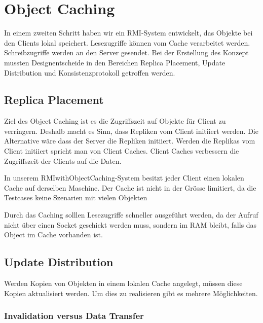 \chapter{Object Caching}

\label{sec:object-caching}

In einem zweiten Schritt haben wir ein RMI-System entwickelt, das Objekte bei den Clients lokal speichert. Lesezugriffe können vom Cache verarbeitet werden. Schreibzugriffe werden an den Server gesendet. Bei der Erstellung des Konzept mussten Designentscheide in den Bereichen Replica Placement, Update Distribution und Konsistenzprotokoll getroffen werden.

\section{Replica Placement}
\label{sec:replica-management}

Ziel des Object Caching ist es die Zugriffszeit auf Objekte für Client zu verringern. Deshalb macht es Sinn, dass Repliken vom Client initiiert werden. Die Alternative wäre dass der Server die Repliken initiiert. Werden die Replikas vom Client initiiert spricht man von Client Caches. Client Caches verbessern die Zugriffszeit der Clients auf die Daten.

In unserem RMIwithObjectCaching-System besitzt jeder Client einen lokalen Cache auf derselben Maschine. Der Cache ist nicht in der Grösse limitiert, da die Testcases keine Szenarien mit vielen Objekten 

Durch das Caching solllen Lesezugriffe schneller ausgeführt werden, da der Aufruf nicht über einen Socket geschickt werden muss, sondern im RAM bleibt, falls das Object im Cache vorhanden ist.

\section{Update Distribution}
\label{sec:update-distribution}

Werden Kopien von Objekten in einem lokalen Cache angelegt, müssen diese Kopien aktualisiert werden. Um dies zu realisieren gibt es mehrere Möglich\-keiten.

\subsection{Invalidation versus Data Transfer}
\label{sec:inval-vers-data}

